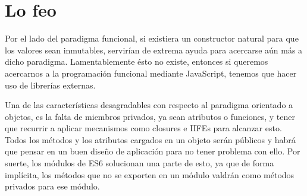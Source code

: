 \section*{Lo feo}

Por el lado del paradigma funcional, si existiera un constructor natural para que los valores sean inmutables, servirían de extrema ayuda para acercarse aún más a dicho paradigma. Lamentablemente ésto no existe, entonces si queremos acercarnos a la programación funcional mediante JavaScript, tenemos que hacer uso de librerías externas.

Una de las características desagradables con respecto al paradigma orientado a objetos, es la falta de miembros privados, ya sean atributos o funciones, y tener que recurrir a aplicar mecanismos como closures e IIFEs para alcanzar esto. Todos los métodos y los atributos cargados en un objeto serán públicos y habrá que pensar en un buen diseño de aplicación para no tener problema con ello. Por suerte, los módulos de ES6 solucionan una parte de esto, ya que de forma implícita, los métodos que no se exporten en un módulo valdrán como métodos privados para ese módulo.